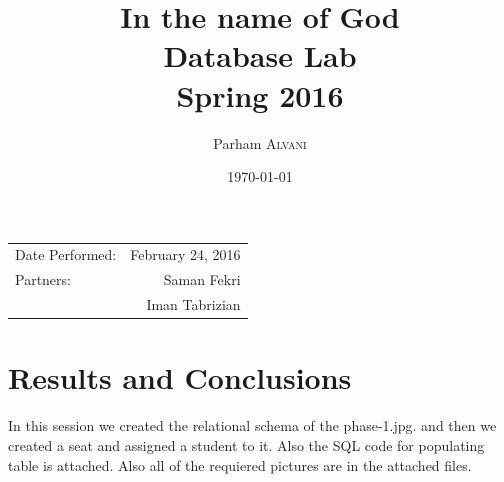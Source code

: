 \documentclass{article}
\title{In the name of God \\ Database Lab \\ Spring 2016} %
\author{Parham \textsc{Alvani}} %
\date{\today} %
\begin{document}
\maketitle %

\begin{center}
\begin{tabular}{l r}
	Date Performed: & February 24, 2016 \\ %
	Partners: & Saman Fekri \\ %
		  & Iman Tabrizian \\
\end{tabular}
\end{center}



\section{Results and Conclusions}

In this session we created the relational schema of the phase-1.jpg.
and then we created a seat and assigned a student to it. Also the SQL code for
populating table is attached. Also all of the requiered pictures are in the attached
files.

\end{document}

